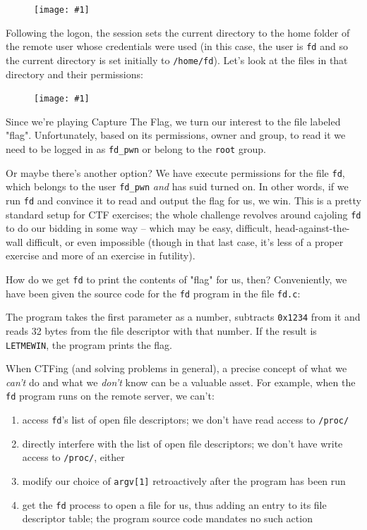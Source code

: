 \documentclass{article}
\newcommand{\displayimage}[1] {
\begin{figure}[H]
    \centering
    \texttt{[image: \#1]} 
\end{figure}
}
\newcommand{\code}[1]{\colorbox{ubuntuback}{\texttt{#1}}}
\begin{document}
\displayimage{./exercises/00_fd/fd_welcome_message.png}

Following the logon, the session sets the current directory to the home folder of the remote user whose credentials were used (in this case, the user is \code{fd} and so the current directory is set initially to \code{/home/fd}). Let's look at the files in that directory and their permissions:

\displayimage{./exercises/00_fd/fd_permissions.png}

Since we're playing Capture The Flag, we turn our interest to the file labeled "flag". Unfortunately, based on its permissions, owner and group, to read it we need to be logged in as \code{fd\_pwn} or belong to the \code{root} group.

Or maybe there's another option? We have execute permissions for the file \code{fd}, which belongs to the user \code{fd\_pwn} \textit{and} has suid turned on. In other words, if we run \code{fd} and convince it to read and output the flag for us, we win. This is a pretty standard setup for CTF exercises; the whole challenge revolves around cajoling \code{fd} to do our bidding in some way -- which may be easy, difficult, head-against-the-wall difficult, or even impossible (though in that last case, it's less of a proper exercise and more of an exercise in futility).

How do we get \code{fd} to print the contents of "flag" for us, then? Conveniently, we have been given the source code for the \code{fd} program in the file \code{fd.c}:



The program takes the first parameter as a number, subtracts \code{0x1234} from it and reads 32 bytes from the file descriptor with that number. If the result is \code{LETMEWIN}, the program prints the flag.

When CTFing (and solving problems in general), a precise concept of what we \textit{can't} do and what we \textit{don't} know can be a valuable asset. For example, when the \code{fd} program runs on the remote server, we can't:

\begin{enumerate}
    \item access \code{fd}'s list of open file descriptors; we don't have read access to \code{/proc/}
    \item directly interfere with the list of open file descriptors; we don't have write access to \code{/proc/}, either
    \item modify our choice of \code{argv[1]} retroactively after the program has been run
    \item get the \code{fd} process to open a file for us, thus adding an entry to its file descriptor table; the program source code mandates no such action 
\end{enumerate}
\end{document}
